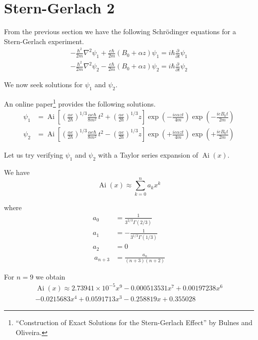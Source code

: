 

\section*{Stern-Gerlach 2}

From the previous section we have the following Schr\"odinger equations
for a Stern-Gerlach experiment.
\begin{align*}
-\frac{\hbar^2}{2m}\nabla^2\psi_1
+\frac{e\hbar}{2m}(B_0+\alpha z)\psi_1
=i\hbar\frac{\partial}{\partial t}\psi_1
\\[1ex]
-\frac{\hbar^2}{2m}\nabla^2\psi_2
-\frac{e\hbar}{2m}(B_0+\alpha z)\psi_2
=i\hbar\frac{\partial}{\partial t}\psi_2
\end{align*}

We now seek solutions for $\psi_1$ and $\psi_2$.

\bigskip
An online paper\footnote{``Construction of Exact Solutions for the Stern-Gerlach Effect'' by Bulnes and Oliveira.}
provides the following solutions.
\begin{align*}
\psi_1&=\operatorname{Ai}\left[
\left(\frac{\alpha e}{2\hbar}\right)^{1/3}
\frac{\alpha e\hbar}{8m^2}\,t^2
+\left(\frac{\alpha e}{2\hbar}\right)^{1/3}z\right]
\exp\left(-\frac{ie\alpha zt}{4m}\right)
\exp\left(-\frac{ieB_0t}{2m}\right)
\\[1ex]
\psi_2&=\operatorname{Ai}\left[
\left(\frac{\alpha e}{2\hbar}\right)^{1/3}
\frac{\alpha e\hbar}{8m^2}\,t^2
-\left(\frac{\alpha e}{2\hbar}\right)^{1/3}z\right]
\exp\left(+\frac{ie\alpha zt}{4m}\right)
\exp\left(+\frac{ieB_0t}{2m}\right)
\end{align*}

Let us try verifying $\psi_1$ and $\psi_2$ with a Taylor series
expansion of $\operatorname{Ai}(x)$.

\bigskip
We have
\begin{equation*}
\operatorname{Ai}(x)\approx\sum_{k=0}^n a_kx^k
\end{equation*}

where
\begin{align*}
a_0&=\frac{1}{3^{2/3}\Gamma(2/3)}
\\
a_1&=-\frac{1}{3^{1/3}\Gamma(1/3)}
\\
a_2&=0
\\\
a_{n+3}&=\frac{a_n}{(n+3)(n+2)}
\end{align*}

For $n=9$ we obtain
\begin{multline*}
\operatorname{Ai}(x)\approx
2.73941\times10^{-5}x^9
-0.000513531x^7
+0.00197238x^6
\\
-0.0215683x^4
+0.0591713x^3
-0.258819x
+0.355028
\end{multline*}

